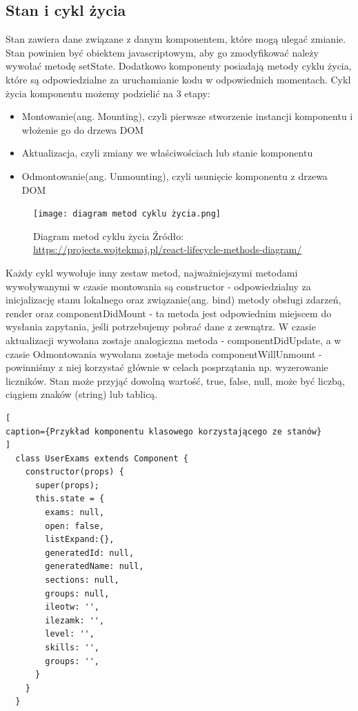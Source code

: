 \documentclass[oneside,polski,logo,indent]{amuthesis}
\begin{document}
\subsection{Stan i cykl życia}{

Stan zawiera dane związane z danym komponentem, które mogą ulegać zmianie. Stan powinien być obiektem javascriptowym, aby go zmodyfikować należy wywołać metodę setState. Dodatkowo komponenty posiadają metody cyklu życia, które są odpowiedzialne za uruchamianie kodu w odpowiednich momentach.
\newline
Cykl życia komponentu możemy podzielić na 3 etapy:
\begin{itemize}
\item Montowanie(ang. Mounting), czyli pierwsze stworzenie instancji komponentu i włożenie go do drzewa DOM
\item Aktualizacja, czyli zmiany we właściwościach lub stanie komponentu
\item Odmontowanie(ang. Unmounting), czyli usunięcie komponentu z drzewa DOM
\end{itemize}
\begin{figure}[H]
\centering
\texttt{[image: diagram metod cyklu życia.png]}
\caption{Diagram metod cyklu życia
\newline
Źródło: \url{https://projects.wojtekmaj.pl/react-lifecycle-methods-diagram/}
}
\label{metody cyklu zycia}
\end{figure}
Każdy cykl wywołuje inny zestaw metod, najważniejszymi metodami wywoływanymi w czasie montowania są constructor - odpowiedzialny za inicjalizację stanu lokalnego oraz związanie(ang. bind) metody obsługi zdarzeń, render oraz componentDidMount - ta metoda jest odpowiednim miejscem do wysłania zapytania, jeśli potrzebujemy pobrać dane z zewnątrz.
W czasie aktualizacji wywołana zostaje analogiczna metoda - componentDidUpdate, a w czasie Odmontowania wywołana zostaje metoda componentWillUnmount - powinniśmy z niej korzystać głównie w celach posprzątania np. wyzerowanie liczników.
\newline
\newline
Stan może przyjąć dowolną wartość, true, false, null, może być liczbą, ciągiem znaków (string) lub tablicą.

\begin{lstlisting}[
caption={Przykład komponentu klasowego korzystającego ze stanów}
]
  class UserExams extends Component {
    constructor(props) {
      super(props);
      this.state = {
        exams: null,
        open: false,
        listExpand:{},
        generatedId: null,
        generatedName: null,
        sections: null,
        groups: null,
        ileotw: '',
        ilezamk: '',
        level: '',
        skills: '', 
        groups: '',
      }
    }
  }

\end{lstlisting}

}
\end{document}
